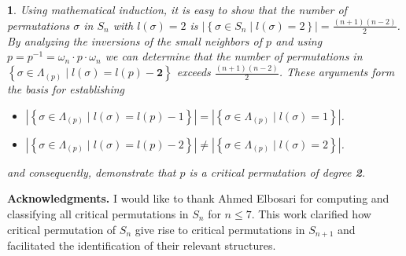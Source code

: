 \documentclass[a4 paper,12pt]{article}
\newtheorem{numeris}{}[section]
\begin{document}
\begin{numeris}
Using mathematical induction, it is easy to show that the number of permutations $\sigma$ in $S_{n}$ with $l(\sigma) = 2$ is  $\left|\left\{\sigma\in S_n \mid l(\sigma)= 2\right\}\right| = \frac{(n+1)(n-2)}{2} $. By analyzing the inversions of the small neighbors of $p$ and using $p=p^{-1}=\omega_{n}\cdot p\cdot \omega_{n}$ we can determine that the number of permutations in $\left\{\sigma\in \Lambda_{(p)} \mid l(\sigma)= l(p)-\textbf{2}\right\}$ exceeds $\frac{(n+1)(n-2)}{2}$. 
These arguments form the basis for establishing 
\begin{itemize}
	\item $\left|\left\{\sigma\in \Lambda_{(p)} \mid l(\sigma)=l(p)- 1\right\}\right| = \left|\left\{\sigma\in \Lambda_{(p)} \mid l(\sigma)=1\right\}\right|$.
	\item $\left|\left\{\sigma\in \Lambda_{(p)} \mid l(\sigma)=l(p)- 2\right\}\right| \neq \left|\left\{\sigma\in \Lambda_{(p)} \mid l(\sigma)=2\right\}\right|$.
	\end{itemize}
and consequently, demonstrate that $p$ is a  critical permutation of degree \textit{\textbf{2}}.
\label{second_degree}
\end{numeris}
\label{sec:OtherCriticalPermutations}


\textbf{Acknowledgments.}  
I would like to thank Ahmed Elbosari for  computing and classifying all critical permutations in $S_n$ for $n\leq 7$.  This work clarified  how critical permutation of $S_n$ give rise to critical permutations in  $S_{n+1}$  and facilitated the identification of their relevant structures.
\end{document}
